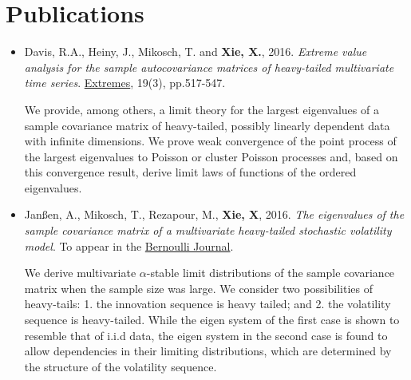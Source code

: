 \documentclass[a4paper]{twentysecondcv} %
\begin{document}


\section{Publications}

\begin{itemize}
\item Davis, R.A., Heiny, J., Mikosch, T. and {\bf Xie, X.},
  2016. {\it Extreme value analysis for the sample autocovariance
    matrices of heavy-tailed multivariate time series}.
  \underline{Extremes}, 19(3), pp.517-547.
  
  {\small
  We provide, among others, a limit theory for the largest eigenvalues
  of a sample covariance matrix of heavy-tailed, possibly linearly
  dependent data with infinite dimensions. We prove weak convergence of
  the point process of the largest eigenvalues to Poisson or cluster
  Poisson processes and, based on this convergence result, derive limit
  laws of functions of the ordered eigenvalues.}

\item Jan\ss en, A., Mikosch, T., Rezapour, M., {\bf Xie, X},
  2016. {\it The eigenvalues of the sample covariance matrix of a
    multivariate heavy-tailed stochastic volatility model}.
  To appear in the \underline{Bernoulli Journal}.
  
  {\small
  We derive multivariate $\alpha$-stable limit distributions of the
  sample covariance matrix when the sample size was large. We
  consider two possibilities of heavy-tails: 1. the innovation
  sequence is heavy tailed; and 2. the volatility sequence is
  heavy-tailed. While the eigen system of the first case is shown to
  resemble that of i.i.d data, the eigen system in the second case is
  found to allow dependencies in their limiting distributions, which
  are determined by the structure of the volatility sequence.}
\end{itemize}
\end{document}
